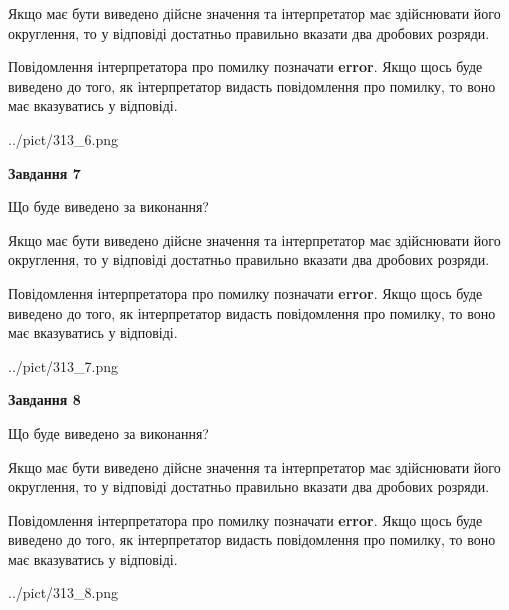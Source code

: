 \documentclass[12pt, ukrainian]{article}
\begin{document}
{\begin {Large}
Якщо має бути виведено дійсне значення та інтерпретатор має здійснювати його округлення, 
то у відповіді достатньо правильно вказати два дробових розряди.

Повідомлення інтерпретатора про помилку позначати \textbf{error}.
Якщо щось буде виведено до того, як інтерпретатор видасть повідомлення про помилку, 
то воно має вказуватись у відповіді. \par

\begin{center}
	{../pict/313_6.png}
\end{center}
\newpage

{\begin {center}\textbf{Завдання 7}\end {center}}\par
Що буде виведено за виконання? \par

Якщо має бути виведено дійсне значення та інтерпретатор має здійснювати його округлення, 
то у відповіді достатньо правильно вказати два дробових розряди.

Повідомлення інтерпретатора про помилку позначати \textbf{error}.
Якщо щось буде виведено до того, як інтерпретатор видасть повідомлення про помилку, 
то воно має вказуватись у відповіді. \par

\begin{center}
	{../pict/313_7.png}
\end{center}
\newpage

{\begin {center}\textbf{Завдання 8}\end {center}}\par
Що буде виведено за виконання? \par

Якщо має бути виведено дійсне значення та інтерпретатор має здійснювати його округлення, 
то у відповіді достатньо правильно вказати два дробових розряди.

Повідомлення інтерпретатора про помилку позначати \textbf{error}.
Якщо щось буде виведено до того, як інтерпретатор видасть повідомлення про помилку, 
то воно має вказуватись у відповіді. \par

\begin{center}
	{../pict/313_8.png}
\end{center}
\newpage


\end{Large}}
\end{document}
